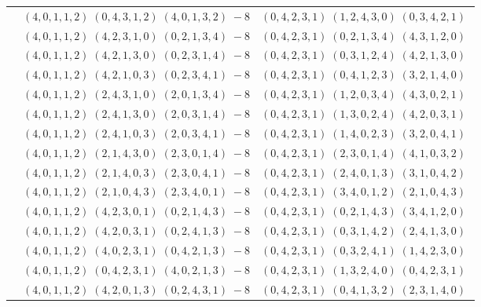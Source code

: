 \documentclass[11pt]{article}
\begin{document}
\begin{longtable}[l]{|c|c|c|}
 \cline{2-3} 
 & $(4 ,0 ,1 ,1 ,2) \;(0 ,4 ,3 ,1 ,2) \;(4 ,0 ,1 ,3 ,2) \;-8$ & $(0 ,4 ,2 ,3 ,1) \;(1 ,2 ,4 ,3 ,0) \;(0 ,3 ,4 ,2 ,1) \;$\\ 
 \cline{2-3} 
 & $(4 ,0 ,1 ,1 ,2) \;(4 ,2 ,3 ,1 ,0) \;(0 ,2 ,1 ,3 ,4) \;-8$ & $(0 ,4 ,2 ,3 ,1) \;(0 ,2 ,1 ,3 ,4) \;(4 ,3 ,1 ,2 ,0) \;$\\ 
 \cline{2-3} 
 & $(4 ,0 ,1 ,1 ,2) \;(4 ,2 ,1 ,3 ,0) \;(0 ,2 ,3 ,1 ,4) \;-8$ & $(0 ,4 ,2 ,3 ,1) \;(0 ,3 ,1 ,2 ,4) \;(4 ,2 ,1 ,3 ,0) \;$\\ 
 \cline{2-3} 
 & $(4 ,0 ,1 ,1 ,2) \;(4 ,2 ,1 ,0 ,3) \;(0 ,2 ,3 ,4 ,1) \;-8$ & $(0 ,4 ,2 ,3 ,1) \;(0 ,4 ,1 ,2 ,3) \;(3 ,2 ,1 ,4 ,0) \;$\\ 
 \cline{2-3} 
 & $(4 ,0 ,1 ,1 ,2) \;(2 ,4 ,3 ,1 ,0) \;(2 ,0 ,1 ,3 ,4) \;-8$ & $(0 ,4 ,2 ,3 ,1) \;(1 ,2 ,0 ,3 ,4) \;(4 ,3 ,0 ,2 ,1) \;$\\ 
 \cline{2-3} 
 & $(4 ,0 ,1 ,1 ,2) \;(2 ,4 ,1 ,3 ,0) \;(2 ,0 ,3 ,1 ,4) \;-8$ & $(0 ,4 ,2 ,3 ,1) \;(1 ,3 ,0 ,2 ,4) \;(4 ,2 ,0 ,3 ,1) \;$\\ 
 \cline{2-3} 
 & $(4 ,0 ,1 ,1 ,2) \;(2 ,4 ,1 ,0 ,3) \;(2 ,0 ,3 ,4 ,1) \;-8$ & $(0 ,4 ,2 ,3 ,1) \;(1 ,4 ,0 ,2 ,3) \;(3 ,2 ,0 ,4 ,1) \;$\\ 
 \cline{2-3} 
 & $(4 ,0 ,1 ,1 ,2) \;(2 ,1 ,4 ,3 ,0) \;(2 ,3 ,0 ,1 ,4) \;-8$ & $(0 ,4 ,2 ,3 ,1) \;(2 ,3 ,0 ,1 ,4) \;(4 ,1 ,0 ,3 ,2) \;$\\ 
 \cline{2-3} 
 & $(4 ,0 ,1 ,1 ,2) \;(2 ,1 ,4 ,0 ,3) \;(2 ,3 ,0 ,4 ,1) \;-8$ & $(0 ,4 ,2 ,3 ,1) \;(2 ,4 ,0 ,1 ,3) \;(3 ,1 ,0 ,4 ,2) \;$\\ 
 \cline{2-3} 
 & $(4 ,0 ,1 ,1 ,2) \;(2 ,1 ,0 ,4 ,3) \;(2 ,3 ,4 ,0 ,1) \;-8$ & $(0 ,4 ,2 ,3 ,1) \;(3 ,4 ,0 ,1 ,2) \;(2 ,1 ,0 ,4 ,3) \;$\\ 
 \cline{2-3} 
 & $(4 ,0 ,1 ,1 ,2) \;(4 ,2 ,3 ,0 ,1) \;(0 ,2 ,1 ,4 ,3) \;-8$ & $(0 ,4 ,2 ,3 ,1) \;(0 ,2 ,1 ,4 ,3) \;(3 ,4 ,1 ,2 ,0) \;$\\ 
 \cline{2-3} 
 & $(4 ,0 ,1 ,1 ,2) \;(4 ,2 ,0 ,3 ,1) \;(0 ,2 ,4 ,1 ,3) \;-8$ & $(0 ,4 ,2 ,3 ,1) \;(0 ,3 ,1 ,4 ,2) \;(2 ,4 ,1 ,3 ,0) \;$\\ 
 \cline{2-3} 
 & $(4 ,0 ,1 ,1 ,2) \;(4 ,0 ,2 ,3 ,1) \;(0 ,4 ,2 ,1 ,3) \;-8$ & $(0 ,4 ,2 ,3 ,1) \;(0 ,3 ,2 ,4 ,1) \;(1 ,4 ,2 ,3 ,0) \;$\\ 
 \cline{2-3} 
 & $(4 ,0 ,1 ,1 ,2) \;(0 ,4 ,2 ,3 ,1) \;(4 ,0 ,2 ,1 ,3) \;-8$ & $(0 ,4 ,2 ,3 ,1) \;(1 ,3 ,2 ,4 ,0) \;(0 ,4 ,2 ,3 ,1) \;$\\ 
 \cline{2-3} 
 & $(4 ,0 ,1 ,1 ,2) \;(4 ,2 ,0 ,1 ,3) \;(0 ,2 ,4 ,3 ,1) \;-8$ & $(0 ,4 ,2 ,3 ,1) \;(0 ,4 ,1 ,3 ,2) \;(2 ,3 ,1 ,4 ,0) \;$\\ 

\end{longtable}
\end{document}
